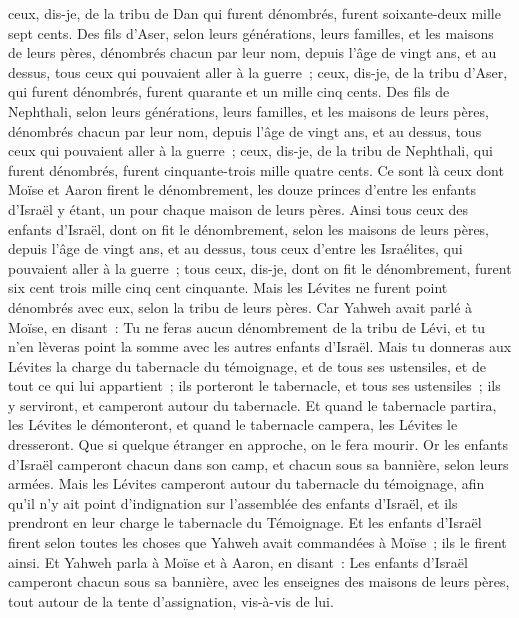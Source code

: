 \begin{multicols}{2}
ceux, dis-je, de la tribu de Dan qui furent dénombrés, furent soixante-deux mille sept cents.
Des fils d'Aser, selon leurs générations, leurs familles, et les maisons de leurs pères, dénombrés chacun par leur nom, depuis l'âge de vingt ans, et au dessus, tous ceux qui pouvaient aller à la guerre~;
ceux, dis-je, de la tribu d'Aser, qui furent dénombrés, furent quarante et un mille cinq cents.
Des fils de Nephthali, selon leurs générations, leurs familles, et les maisons de leurs pères, dénombrés chacun par leur nom, depuis l'âge de vingt ans, et au dessus, tous ceux qui pouvaient aller à la guerre~;
ceux, dis-je, de la tribu de Nephthali, qui furent dénombrés, furent cinquante-trois mille quatre cents.
Ce sont là ceux dont Moïse et Aaron firent le dénombrement, les douze princes d'entre les enfants d'Israël y étant, un pour chaque maison de leurs pères.
Ainsi tous ceux des enfants d'Israël, dont on fit le dénombrement, selon les maisons de leurs pères, depuis l'âge de vingt ans, et au dessus, tous ceux d'entre les Israélites, qui pouvaient aller à la guerre~;
tous ceux, dis-je, dont on fit le dénombrement, furent six cent trois mille cinq cent cinquante.
Mais les Lévites ne furent point dénombrés avec eux, selon la tribu de leurs pères.
Car Yahweh avait parlé à Moïse, en disant~:
Tu ne feras aucun dénombrement de la tribu de Lévi, et tu n'en lèveras point la somme avec les autres enfants d'Israël.
Mais tu donneras aux Lévites la charge du tabernacle du témoignage, et de tous ses ustensiles, et de tout ce qui lui appartient~; ils porteront le tabernacle, et tous ses ustensiles~; ils y serviront, et camperont autour du tabernacle.
Et quand le tabernacle partira, les Lévites le démonteront, et quand le tabernacle campera, les Lévites le dresseront. Que si quelque étranger en approche, on le fera mourir.
Or les enfants d'Israël camperont chacun dans son camp, et chacun sous sa bannière, selon leurs armées.
Mais les Lévites camperont autour du tabernacle du témoignage, afin qu'il n'y ait point d'indignation sur l'assemblée des enfants d'Israël, et ils prendront en leur charge le tabernacle du Témoignage.
Et les enfants d'Israël firent selon toutes les choses que Yahweh avait commandées à Moïse~; ils le firent ainsi.
\VerseOne{}Et Yahweh parla à Moïse et à Aaron, en disant~:
Les enfants d'Israël camperont chacun sous sa bannière, avec les enseignes des maisons de leurs pères, tout autour de la tente d'assignation, vis-à-vis de lui.

\end{multicols}

